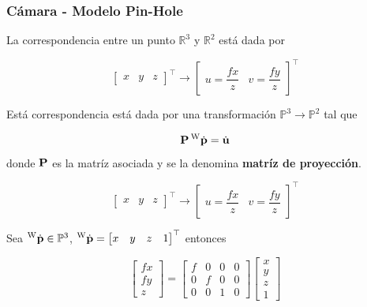 \begin{frame}
    \frametitle{Cámara - Modelo Pin-Hole}   
    \footnotesize
    La correspondencia entre un punto $\mathbb{R}^{3}$ y $\mathbb{R}^{2}$ está dada por 
    
    \begin{equation*}
        \begin{bmatrix}x & y & z\end{bmatrix}^{\top} \rightarrow  \begin{bmatrix} u=\dfrac{fx}{z} & v=\dfrac{fy}{z} \end{bmatrix}^{\top}
    \end{equation*}

    Está correspondencia está dada por una transformación $\mathbb{P}^{3} \rightarrow \mathbb{P}^{2}$ tal que
    
    \begin{equation*}
        \boldsymbol{\mathbf{P}} \prescript{\mathrm{\mathrm{W}}}{}{\dot{\boldsymbol{\mathbf{p}}}}= \dot{\boldsymbol{\mathbf{u}}}
    \end{equation*}
    donde $\boldsymbol{\mathbf{P}}$ es la matríz asociada y se la denomina {\bf matríz de proyección}.
    
    \begin{equation}
        \begin{bmatrix}x & y & z\end{bmatrix}^{\top} \rightarrow  \begin{bmatrix} u=\dfrac{fx}{z} & v=\dfrac{fy}{z} \end{bmatrix}^{\top}
    \end{equation}

    Sea $\prescript{\mathrm{\mathrm{W}}}{}{\dot{\boldsymbol{\mathbf{p}}}} \in \mathbb{P}^{3}$, $\prescript{\mathrm{\mathrm{W}}}{}{\dot{\boldsymbol{\mathbf{p}}}} = \begin{bmatrix}x & y & z & 1\end{bmatrix}^{\top}$ entonces

    \begin{equation}
        \begin{bmatrix}
            fx\\
            fy\\
            z
        \end{bmatrix}
        =
        \begin{bmatrix}
            f & 0 & 0 & 0\\
            0 & f & 0 & 0\\
            0 & 0 & 1 & 0
        \end{bmatrix}
        \begin{bmatrix}
            x\\
            y\\
            z\\
            1
        \end{bmatrix}
    \end{equation}

\end{frame}

